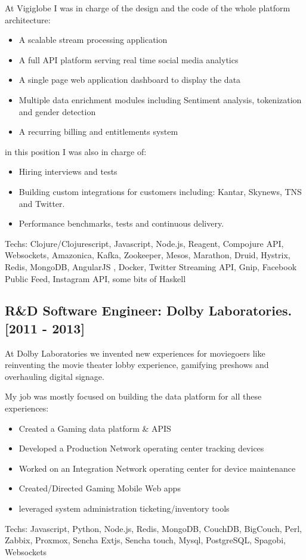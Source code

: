 \documentclass{article}
\begin{document}
At Vigiglobe I was in charge of the design and the code of the whole platform architecture:

\begin{itemize}
\item A scalable stream processing application
\item A full API platform serving real time social media analytics
\item A single page web application dashboard to display the data
\item Multiple data enrichment modules including Sentiment analysis, tokenization and gender detection
\item A recurring billing and entitlements system
\end{itemize}
in this position I was also in charge of:

\begin{itemize}
\item Hiring interviews and tests
\item Building custom integrations for customers including: Kantar, Skynews, TNS and Twitter.
\item Performance benchmarks, tests and continuous delivery.
\end{itemize}
Techs: Clojure/Clojurescript, Javascript, Node.js, Reagent, Compojure API,
Websockets, Amazonica, Kafka, Zookeeper, Mesos, Marathon, Druid, Hystrix, Redis, MongoDB,
AngularJS , Docker, Twitter Streaming API, Gnip, Facebook Public Feed, Instagram API, some bits of Haskell

\subsection*{R\&D Software Engineer: Dolby Laboratories. [2011 - 2013]}
At Dolby Laboratories we invented new experiences for moviegoers like
reinventing the movie theater lobby experience, gamifying preshows and overhauling digital signage.

My job was mostly focused on building the data platform for all these experiences:

\begin{itemize}
\item Created a Gaming data platform \& APIS
\item Developed a Production Network operating center tracking devices
\item Worked on an Integration Network operating center for device maintenance
\item Created/Directed Gaming Mobile Web apps
\item leveraged system administration ticketing/inventory tools
\end{itemize}
Techs: Javascript, Python, Node.js, Redis, MongoDB, CouchDB, BigCouch, Perl, Zabbix, Proxmox,
Sencha Extjs, Sencha touch, Mysql, PostgreSQL, Spagobi, Websockets
\end{document}
